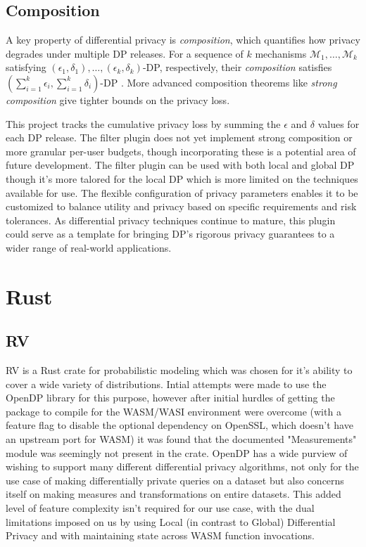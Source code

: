 \subsection{Composition}
A key property of differential privacy is \textit{composition}, which quantifies how privacy degrades under multiple DP releases. For a sequence of $k$ mechanisms $\mathcal{M}_1, \ldots, \mathcal{M}_k$ satisfying $(\epsilon_1, \delta_1), \ldots, (\epsilon_k, \delta_k)$-DP, respectively, their \textit{composition} satisfies $(\sum_{i=1}^k \epsilon_i, \sum_{i=1}^k \delta_i)$-DP \citep[Thm. 3.16]{Dwork2014}. More advanced composition theorems like \textit{strong composition} \citep[Thm. 3.20]{Dwork2014} give tighter bounds on the privacy loss.

This project tracks the cumulative privacy loss by summing the $\epsilon$ and $\delta$ values for each DP release. The filter plugin does not yet implement strong composition or more granular per-user budgets, though incorporating these is a potential area of future development. The filter plugin can be used with both local and global DP though it's more talored for the local DP which is more limited on the techniques available for use. The flexible configuration of privacy parameters enables it to be customized to balance utility and privacy based on specific requirements and risk tolerances. As differential privacy techniques continue to mature, this plugin could serve as a template for bringing DP's rigorous privacy guarantees to a wider range of real-world applications.
\section{Rust}
\subsection{RV}
RV is a Rust crate for probabilistic modeling which was chosen for it's ability to cover a wide variety of distributions. Intial attempts were made to use the OpenDP library for this purpose, however after initial hurdles of getting the package to compile for the WASM/WASI environment were overcome (with a feature flag to disable the optional dependency on OpenSSL, which doesn't have an upstream port for WASM) it was found that the documented "Measurements" module was seemingly not present in the crate. OpenDP has a wide purview of wishing to support many different differential privacy algorithms, not only for the use case of making differentially private queries on a dataset but also concerns itself on making measures and transformations on entire datasets. This added level of feature complexity isn't required for our use case, with the dual limitations imposed on us by using Local (in contrast to Global) Differential Privacy and with maintaining state across WASM function invocations.   

